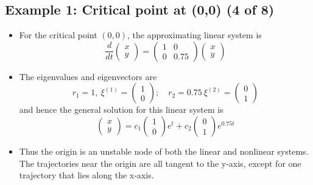 \documentclass[11pt,a4paper]{article}
\begin{document}
	\subsection*{Example 1: Critical point at (0,0) (4 of 8)}
	\begin{itemize}
		\item For the critical point $(0,0)$, the approximating linear system is
		$$
		\frac{d}{dt}
		\begin{pmatrix}
			x\\
			y
		\end{pmatrix}=
		\begin{pmatrix}
			1 & 0\\
			0 & 0.75
		\end{pmatrix}
		\begin{pmatrix}
			x\\
			y
		\end{pmatrix}
		$$
		\item The eigenvalues and eigenvectors are
		$$
		r_1 = 1,\ \xi^{(1)} =
		\begin{pmatrix}
			1\\
			0
		\end{pmatrix};\quad
		r_2 = 0.75\ \xi^{(2)}=
		\begin{pmatrix}
			0\\
			1
		\end{pmatrix}
		$$
		and hence the general solution for this linear system is
		$$
		\begin{pmatrix}
			x\\
			y
		\end{pmatrix} = c_1
		\begin{pmatrix}
			1\\
			0
		\end{pmatrix}e^t + c_2
		\begin{pmatrix}
			0\\
			1
		\end{pmatrix}e^{0.75t}
		$$
		\item Thus the origin is an unstable node of both the linear and nonlinear systems. The trajectories near the origin are all tangent to the y-axis, except for one trajectory that lies along the x-axis.
	\end{itemize}
\end{document}
